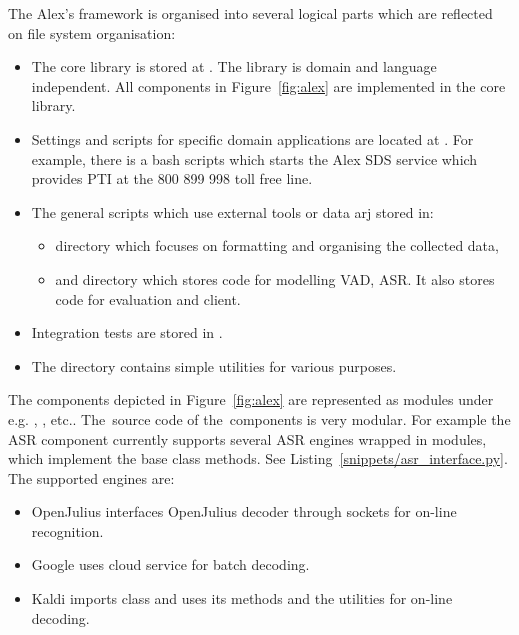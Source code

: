 The Alex's framework is organised into several logical parts which are reflected on file system organisation:
\begin{itemize}
    \item The core library is stored at . The library is domain and language independent. All components in Figure~\ref{fig:alex} are implemented in the core library.
    \item Settings and scripts for specific domain applications are located at .
        For example, there is a bash scripts  which starts the Alex \ac{SDS} service which provides \acl{PTI} at the 800 899 998 toll free line.
    \item The general scripts which use external tools or data arj stored in:
        \begin{itemize}
            \item {} directory which focuses on formatting and organising the collected data,
            \item and \term {} directory which stores code for modelling \ac{VAD}, \ac{ASR}. It also stores code for evaluation and  client.
        \end{itemize}
    \item Integration tests are stored in .
    \item The  directory contains simple utilities for various purposes.
\end{itemize}

The components depicted in Figure~\ref{fig:alex} are represented as 
modules under  e.g. ,  , etc..
The~source code of the~components is very modular.
For example the \ac{ASR} component currently supports several \ac{ASR} engines wrapped in modules, which implement the base class  methods. 
See Listing~\ref{snippets/asr_interface.py}.
The supported engines are:
\begin{itemize}
    \item OpenJulius  interfaces OpenJulius decoder through sockets for on-line recognition.
    \item Google  uses cloud service for batch decoding.
    \item Kaldi  imports  class and uses its methods and the utilities for on-line decoding.
\end{itemize}


